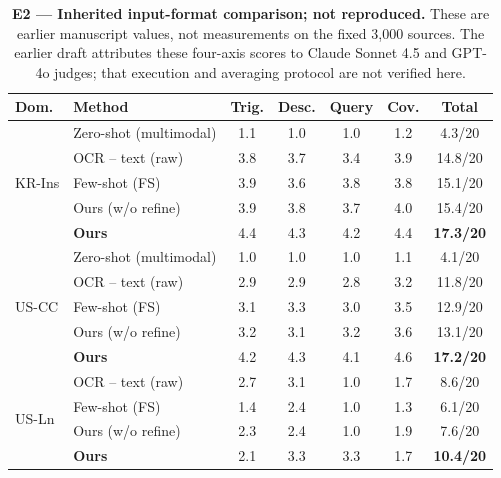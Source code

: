 \documentclass[11pt]{article}
\begin{document}
\begin{table}[t]
\centering
\small
\setlength{\tabcolsep}{4pt}


\begin{tabular}{llccccc}
\toprule
Dom. & Method & Trig. & Desc. & Query & Cov. & Total \\
\midrule
\multirow{5}{*}{KR-Ins}
  & Zero-shot (multimodal)  & 1.1 & 1.0 & 1.0 & 1.2 &  4.3/20 \\
  & OCR -- text (raw)       & 3.8 & 3.7 & 3.4 & 3.9 & 14.8/20 \\
  & Few-shot (FS)           & 3.9 & 3.6 & 3.8 & 3.8 & 15.1/20 \\
  & Ours (w/o refine)       & 3.9 & 3.8 & 3.7 & 4.0 & 15.4/20 \\
  & \textbf{Ours}           & 4.4 & 4.3 & 4.2 & 4.4 & \textbf{17.3/20} \\

\midrule
\multirow{5}{*}{US-CC}
  & Zero-shot (multimodal)  & 1.0 & 1.0 & 1.0 & 1.1 &  4.1/20 \\
  & OCR -- text (raw)       & 2.9 & 2.9 & 2.8 & 3.2 & 11.8/20 \\
  & Few-shot (FS)           & 3.1 & 3.3 & 3.0 & 3.5 & 12.9/20 \\
  & Ours (w/o refine)       & 3.2 & 3.1 & 3.2 & 3.6 & 13.1/20 \\
    & \textbf{Ours}           & 4.2 & 4.3 & 4.1 & 4.6 & \textbf{17.2/20} \\
\midrule
\multirow{4}{*}{US-Ln}
  & OCR -- text (raw)       & 2.7 & 3.1 & 1.0 & 1.7 &  8.6/20 \\
  & Few-shot (FS)           & 1.4 & 2.4 & 1.0 & 1.3 &  6.1/20 \\
  & Ours (w/o refine)       & 2.3 & 2.4 & 1.0 & 1.9 &  7.6/20 \\
  & \textbf{Ours}           & 2.1 & 3.3 & 3.3 & 1.7 & \textbf{10.4/20} \\
\bottomrule
\end{tabular}
\caption{\textbf{E2 --- Inherited input-format comparison; not reproduced.}
These are earlier manuscript values, not measurements on the fixed 3,000 sources.
The earlier draft attributes these four-axis scores to Claude Sonnet 4.5 and
GPT-4o judges; that execution and averaging protocol are not verified here.
}
\label{tab:e2}
\end{table}
\end{document}
